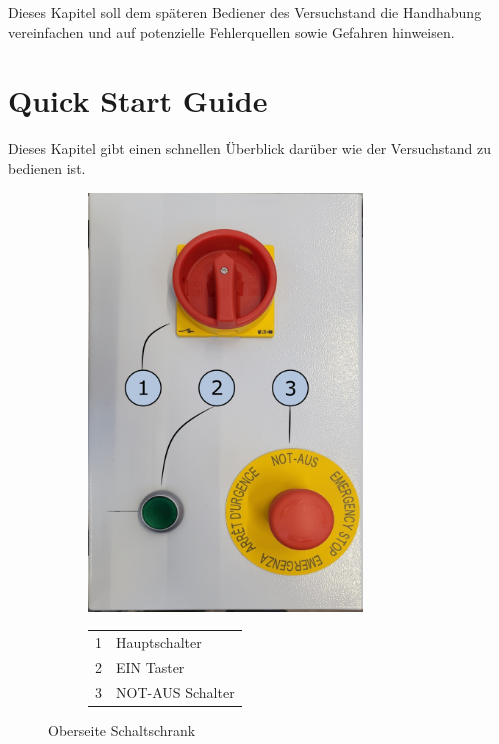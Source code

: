 Dieses Kapitel soll dem späteren Bediener des Versuchstand die Handhabung vereinfachen und auf potenzielle Fehlerquellen sowie Gefahren hinweisen.



\section{Quick Start Guide}
Dieses Kapitel gibt einen schnellen Überblick darüber wie der Versuchstand zu bedienen ist. 
\begin{figure}[!h]
    \centering
    \begin{subfigure}[]{.45\textwidth}
        \centering
        \includegraphics[width=0.8\textwidth]{Abbildungen/Manuel/Schrank_oben_bb_oo.png}
        
    \end{subfigure}
    \begin{subfigure}[]{.45\textwidth}
            \begin{tabular}{c|l}
               1    & Hauptschalter\\
               2    & EIN Taster  \\
               3    & NOT-AUS Schalter
            \end{tabular}
    \end{subfigure}
    \caption{Oberseite Schaltschrank}
    \label{fig:b_schaltschrank}   
\end{figure}

